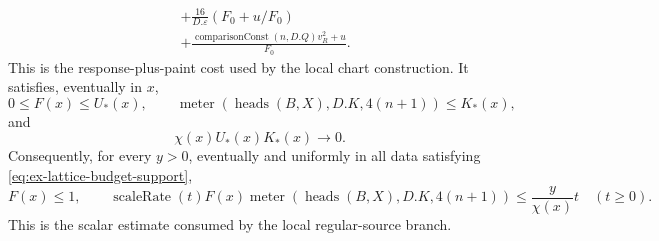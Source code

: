 \begin{proposition}
\begin{equation}
\begin{aligned}
 &+\frac{16}{D.\varepsilon}(F_0+u/F_0)\\
 &+\frac{\operatorname{comparisonConst}(n,D.Q)v_R^2+u}{F_0}.
\end{aligned}
\label{eq:ex-lattice-explicit-local-cost}
\end{equation}
This is the response-plus-paint cost used by the local chart construction.
It satisfies,
eventually in \(x\),
\begin{equation}
 0\le F(x)\le U_*(x),\qquad
 \operatorname{meter}(\operatorname{heads}(B,X),D.K,4(n+1))\le K_*(x),
 \label{eq:ex-lattice-budget-majorants}
\end{equation}
and
\begin{equation}
 \chi(x)U_*(x)K_*(x)\longrightarrow0.
 \label{eq:ex-lattice-budget-small}
\end{equation}
Consequently, for every \(y>0\), eventually and uniformly in all data
satisfying \eqref{eq:ex-lattice-budget-support},
\begin{equation}
 F(x)\le1,\qquad
 \operatorname{scaleRate}(t)F(x)\operatorname{meter}(\operatorname{heads}(B,X),D.K,4(n+1))
       \le \frac{y}{\chi(x)}t\quad(t\ge0).
 \label{eq:ex-lattice-budget-output}
\end{equation}
This is the scalar estimate consumed by the local regular-source branch.
\end{proposition}
